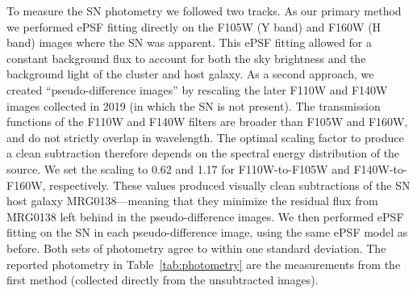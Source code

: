 \documentclass[12pt,dvipsnames]{article}
\begin{document}
To measure the SN photometry we followed two tracks.  As our primary method we performed ePSF fitting directly on the F105W (Y band) and F160W (H band) images where the SN was apparent.  This ePSF fitting allowed for a constant background flux to account for both the sky brightness and the background light of the cluster and host galaxy.  
As a second approach, we created ``pseudo-difference images'' by rescaling the later F110W and F140W images collected in 2019 (in which the SN is not present).  The transmission functions of the F110W and F140W filters are broader than F105W and F160W, and do not strictly overlap in wavelength.  The optimal scaling factor to produce a clean subtraction therefore depends on the spectral energy distribution of the source.  We set the scaling to 0.62 and 1.17 for F110W-to-F105W and F140W-to-F160W, respectively.  These values produced visually clean subtractions of the SN host galaxy MRG0138---meaning that they minimize the residual flux from MRG0138 left behind in the pseudo-difference images.  We then performed ePSF fitting on the SN in each pseudo-difference image, using the same ePSF model as before.   Both sets of photometry agree to within one standard deviation.  The reported photometry in Table~\ref{tab:photometry} are the measurements from the first method (collected directly from the unsubtracted images).
\end{document}
